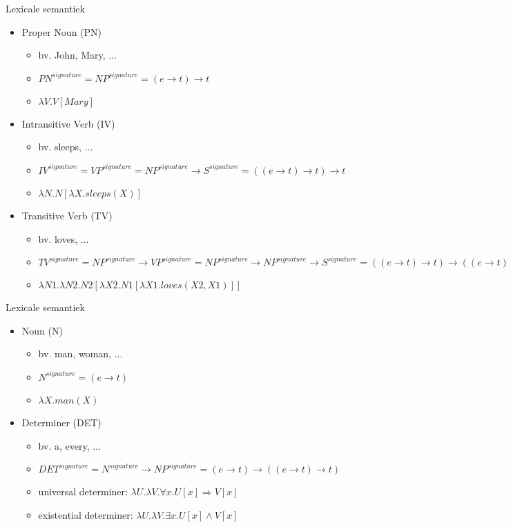 \documentclass[notes, dvipsnames]{beamer}
\newcommand{\hitem}{
	\ppause
	\item
}
\newcommand{\ppause}{\onslide<+>}
\begin{document}
	\begin{frame}{Lexicale semantiek}
		\begin{itemize}
      \hitem Proper Noun (PN)
      \begin{itemize}
        \item bv. John, Mary, ...
        \hitem $PN^{signature} = NP^{signature} = (e \rightarrow t) \rightarrow t$
        \hitem $\lambda V.V[Mary]$
      \end{itemize}

      \hitem Intransitive Verb (IV)
      \begin{itemize}
        \item bv. sleeps, ...
        \hitem $IV^{signature} = VP^{signature} = NP^{signature} \rightarrow S^{signature} = ((e \rightarrow t) \rightarrow t) \rightarrow t$
        \hitem $\lambda N.N[\lambda X.sleeps(X)]$
      \end{itemize}

      \hitem Transitive Verb (TV)
      \begin{itemize}
        \item bv. loves, ...
          \hitem $TV^{signature} = NP^{signature} \rightarrow VP^{signature} = NP^{signature} \rightarrow NP^{signature} \rightarrow S^{signature} = ((e \rightarrow t) \rightarrow t) \rightarrow ((e \rightarrow t) \rightarrow t) \rightarrow t$
        \hitem $\lambda N1.\lambda N2.N2[\lambda X2.N1[\lambda X1.loves(X2,X1)]]$
      \end{itemize}
		\end{itemize}
	\end{frame}
	\begin{frame}{Lexicale semantiek}
		\begin{itemize}
      \hitem Noun (N)
      \begin{itemize}
        \item bv. man, woman, ...
        \hitem $N^{signature} = (e \rightarrow t)$
        \hitem $\lambda X.man(X)$
      \end{itemize}
      \hitem Determiner (DET)
      \begin{itemize}
        \item bv. a, every, ...
        \hitem $DET^{signature} = N^{signature} \rightarrow NP^{signature} = (e \rightarrow t) \rightarrow ((e \rightarrow t) \rightarrow t)$
        \hitem universal determiner: $\lambda U.\lambda V.\forall x. U[x] \Rightarrow V[x]$
        \hitem existential determiner: $\lambda U.\lambda V.\exists x. U[x] \land V[x]$
      \end{itemize}
		\end{itemize}
	\end{frame}
\end{document}
